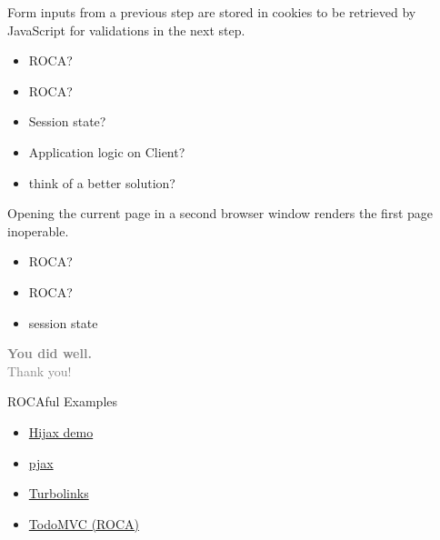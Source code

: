 \documentclass{beamer}
\newcommand{\rocafail}{\ding{55}}
\begin{document}
\begin{frame}
  Form inputs from a previous step are stored in cookies to be retrieved by
  JavaScript for validations in the next step.

  \vspace{0.3cm}
  \begin{itemize}
    \item<1|only@1>[\Large $\square$] \Large ROCA?
    \item<2->[\Large \rocafail] \Large ROCA?
    \item<2-> Session state?
    \item<2-> Application logic on Client?
    \item<3> think of a better solution?
  \end{itemize}

\end{frame}

\begin{frame}
  Opening the current page in a second browser window renders the first page inoperable.

  \vspace{0.3cm}
  \begin{itemize}
    \item<1|only@1>[\Large $\square$] \Large ROCA?
    \item<2->[\Large \rocafail] \Large ROCA?
    \item<2-> session state
  \end{itemize}

\end{frame}

\begin{frame}
  \vspace*{-2cm}
  \textcolor{gray}{
    \begin{center}
      \textbf{ \fontsize{50}{80} \selectfont You did well. \\ }
      {\fontsize{30}{30} \selectfont Thank you!}
    \end{center}
  }
\end{frame}

\begin{frame}{ROCAful Examples}
  \begin{itemize}
    \item \href{http://fnd.github.com/hijax-demo/}{Hijax demo}
    \item \href{http://pjax.heroku.com}{pjax}
    \item \href{https://github.com/rails/turbolinks}{Turbolinks}
    \item \href{http://rocatodo.herokuapp.com}{TodoMVC (ROCA)}
  \end{itemize}
\end{frame}
\end{document}
